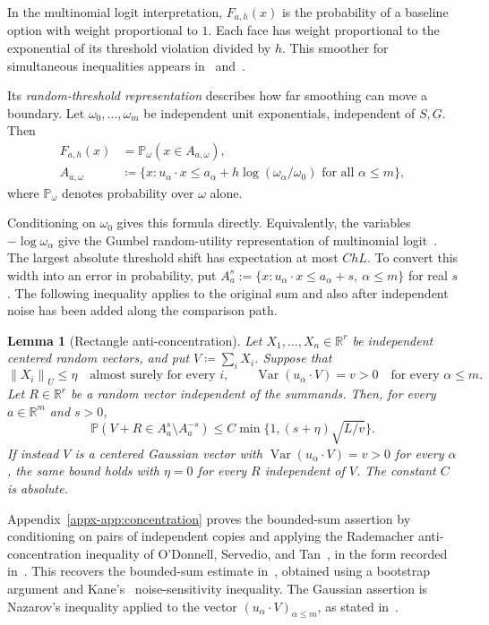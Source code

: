 \documentclass[11pt,letterpaper]{article}
\newtheorem{lemma}{Lemma}
\theoremstyle{remark}
\newcommand{\Pp}{\mathbb P}
\newcommand{\R}{\mathbb R}
\newcommand{\Var}{\operatorname{Var}}
\newcommand{\norm}[1]{\left\lVert#1\right\rVert}
\begin{document}
In the multinomial logit interpretation, \(F_{a,h}(x)\) is the probability
of a baseline option with weight proportional to \(1\). Each face has
weight proportional to the exponential of its threshold violation divided
by \(h\). This smoother for simultaneous inequalities appears
in~\cite[p.~1001]{McFadden1989} and~\cite[eq.~(5)]{GaoZhang}.

Its \emph{random-threshold representation} describes how far smoothing
can move a boundary. Let \(\omega_0,\ldots,\omega_m\) be independent
unit exponentials, independent of \(S,G\). Then
\begin{equation}
 \begin{split}
 F_{a,h}(x)&=\Pp_\omega(x\in A_{a,\omega}),\\
 A_{a,\omega}&\coloneqq\{x:u_\alpha\cdot x\le
 a_\alpha+h\log(\omega_\alpha/\omega_0)
                   \text{ for all }\alpha\le m\},
 \end{split}
 \label{eq:mixture}
\end{equation}
where $\Pp_\omega$ denotes probability over $\omega$ alone. 

Conditioning on \(\omega_0\) gives this formula directly. Equivalently,
the variables \(-\log\omega_\alpha\) give the Gumbel random-utility
representation of multinomial logit~\cite[Section~2.6]{Yellott1977}.
The largest absolute threshold shift has expectation at most \(ChL\).
To convert this width into an error in probability, put
\(A_a^s:=\{x:u_\alpha\cdot x\le a_\alpha+s,\ \alpha\le m\}\) for
real \(s\). The following inequality applies to the original sum and
also after independent noise has been added along the comparison path.

\begin{lemma}[Rectangle anti-concentration]\label{lem:concentration}
Let \(X_1,\ldots,X_n\in\R^r\) be independent centered random
vectors, and put \(V\coloneqq\sum_iX_i\). Suppose that
\[
 \norm{X_i}_U\le\eta\quad\text{almost surely for every }i,
 \qquad \Var(u_\alpha\cdot V)=v>0
                   \quad\text{for every }\alpha\le m.
\]
Let \(R\in\R^r\) be a random vector independent of the summands.
Then, for every \(a\in\R^m\) and \(s>0\),
\[
 \Pp(V+R\in A_a^s\setminus A_a^{-s})
 \le C\min\{1,(s+\eta)\sqrt{L/v}\}.
\]
If instead \(V\) is a centered Gaussian vector with
\(\Var(u_\alpha\cdot V)=v>0\) for every \(\alpha\), the same
bound holds with \(\eta=0\) for every \(R\) independent of \(V\).
The constant \(C\) is absolute.
\end{lemma}
Appendix~\ref{appx-app:concentration} proves the bounded-sum assertion
by conditioning on pairs of independent copies and applying the
Rademacher anti-concentration inequality of O'Donnell, Servedio,
and Tan~\cite{OST}, in the form recorded
in~\cite[Lemma~J.4]{CCKK2022}. This recovers the bounded-sum estimate
in~\cite[Lemma~2.1]{AL}, obtained using a bootstrap argument and
Kane's~\cite{Kane} noise-sensitivity inequality. The Gaussian assertion
is Nazarov's inequality applied to the vector
\((u_\alpha\cdot V)_{\alpha\le m}\), as stated
in~\cite[Lemma~A.1]{CCK2017}.
\end{document}
